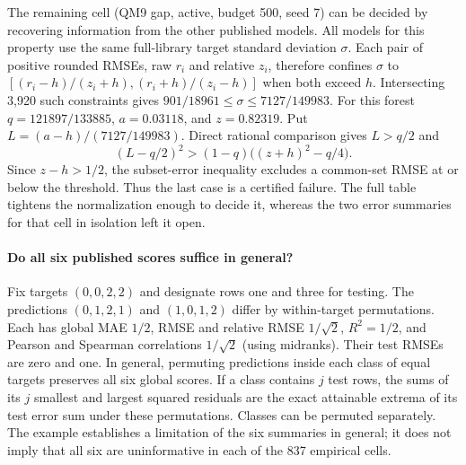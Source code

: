 The remaining cell (QM9 gap, active, budget 500, seed 7) can be decided by recovering information from the other published models. All models for this property use the same full-library target standard deviation $\sigma$. Each pair of positive rounded RMSEs, raw $r_i$ and relative $z_i$, therefore confines $\sigma$ to $[(r_i-h)/(z_i+h),(r_i+h)/(z_i-h)]$ when both exceed $h$. Intersecting 3,920 such constraints gives $901/18961\leq\sigma\leq7127/149983$. For this forest $q=121897/133885$, $a=0.03118$, and $z=0.82319$. Put $L=(a-h)/(7127/149983)$. Direct rational comparison gives $L>q/2$ and
\[
 (L-q/2)^2>(1-q)\bigl((z+h)^2-q/4\bigr).
\]
Since $z-h>1/2$, the subset-error inequality excludes a common-set RMSE at or below the threshold. Thus the last case is a certified failure. The full table tightens the normalization enough to decide it, whereas the two error summaries for that cell in isolation left it open.

\paragraph{Do all six published scores suffice in general?}
Fix targets $(0,0,2,2)$ and designate rows one and three for testing. The predictions $(0,1,2,1)$ and $(1,0,1,2)$ differ by within-target permutations. Each has global MAE $1/2$, RMSE and relative RMSE $1/\sqrt{2}$, $R^2=1/2$, and Pearson and Spearman correlations $1/\sqrt{2}$ (using midranks). Their test RMSEs are zero and one. In general, permuting predictions inside each class of equal targets preserves all six global scores. If a class contains $j$ test rows, the sums of its $j$ smallest and largest squared residuals are the exact attainable extrema of its test error sum under these permutations. Classes can be permuted separately. The example establishes a limitation of the six summaries in general; it does not imply that all six are uninformative in each of the 837 empirical cells.
